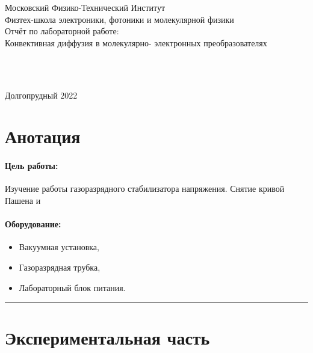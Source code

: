 \documentclass[a4paper,12pt]{article} %
\begin{document}



\begin{center}
{\LARGE Московский Физико-Технический Институт}
\\
{\large Физтех-школа электроники, фотоники и молекулярной физики }
\\
\vspace{8cm}
{\LARGE Отчёт по лабораторной работе:}
\\
{\Huge Конвективная диффузия в молекулярно- электронных преобразователях} 
\\
\vspace{5cm}
\raggedright 
\hspace{7cm}{\large Выполнили студенты группы Б04-005}\\
\hspace{7cm}{\large Карташов Констанин}\\
\hspace{7cm}{\large Давыдов Владислав}

\vspace{\fill}
\center
{\large Долгопрудный 2022}

\end{center}

\newpage


\section{Анотация}

\paragraph{Цель работы:} 
Изучение работы газоразрядного стабилизатора напряжения. Снятие кривой Пашена и 
\paragraph{Оборудование:}
\begin{itemize}
\renewcommand{\labelitemi}{$\triangleright$}
\itemsep0em
\item Вакуумная установка,
\item Газоразрядная трубка,
\item Лабораторный блок питания.
\end{itemize}



\medskip\hrule\medskip

\section{Экспериментальная часть}
\end{document}
